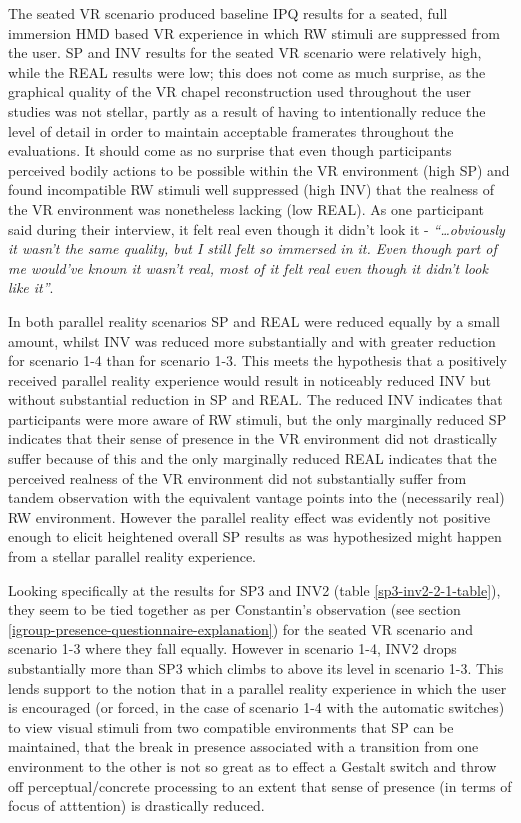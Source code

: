 The seated VR scenario produced baseline IPQ results for a seated, full immersion HMD based VR experience in which RW stimuli are suppressed from the user. SP and INV results for the seated VR scenario were relatively high, while the REAL results were low; this does not come as much surprise, as the graphical quality of the VR chapel reconstruction used throughout the user studies was not stellar, partly as a result of having to intentionally reduce the level of detail in order to maintain acceptable framerates throughout the evaluations. It should come as no surprise that even though participants perceived bodily actions to be possible within the VR environment (high SP) and found incompatible RW stimuli well suppressed (high INV) that the realness of the VR environment was nonetheless lacking (low REAL). As one participant said during their interview, it felt real even though it didn't look it - \textit{``\ldots obviously it wasn't the same quality, but I still felt so immersed in it. Even though part of me would've known it wasn't real, most of it felt real even though it didn't look like it''}.

In both parallel reality scenarios SP and REAL were reduced equally by a small amount, whilst INV was reduced more substantially and with greater reduction for scenario 1-4 than for scenario 1-3. This meets the hypothesis that a positively received parallel reality experience would result in noticeably reduced INV but without substantial reduction in SP and REAL. The reduced INV indicates that participants were more aware of RW stimuli, but the only marginally reduced SP indicates that their sense of presence in the VR environment did not drastically suffer because of this and the only marginally reduced REAL indicates that the perceived realness of the VR environment did not substantially suffer from tandem observation with the equivalent vantage points into the (necessarily real) RW environment. However the parallel reality effect was evidently not positive enough to elicit heightened overall SP results as was hypothesized might happen from a stellar parallel reality experience.

Looking specifically at the results for SP3 and INV2 (table \ref{sp3-inv2-2-1-table}), they seem to be tied together as per Constantin's observation (see section \ref{igroup-presence-questionnaire-explanation}) for the seated VR scenario and scenario 1-3 where they fall equally. However in scenario 1-4, INV2 drops substantially more than SP3 which climbs to above its level in scenario 1-3. This lends support to the notion that in a parallel reality experience in which the user is encouraged (or forced, in the case of scenario 1-4 with the automatic switches) to view visual stimuli from two compatible environments that SP can be maintained, that the break in presence associated with a transition from one environment to the other is not so great as to effect a Gestalt switch and throw off perceptual/concrete processing to an extent that sense of presence (in terms of focus of atttention) is drastically reduced.

